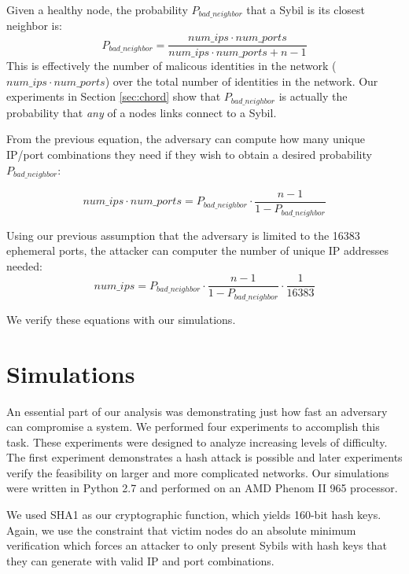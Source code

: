 \documentclass[11pt,conference]{IEEEtran}
\begin{document}
Given a healthy node, the probability $P_{bad\_neighbor}$ that a Sybil is its closest neighbor is:
\begin{equation}
P_{bad\_neighbor} =  \frac{num\_ips \cdot num\_ports}{num\_ips \cdot num\_ports + n - 1}
\label{eq:bad}
\end{equation}
This is effectively the number of malicous identities in the network ($num\_ips \cdot num\_ports$) over the total number of identities in the network.
Our experiments in Section \ref{sec:chord} show that $P_{bad\_neighbor}$ is actually the probability that \textit{any} of a nodes links connect to a Sybil.

From the previous equation, the adversary can compute how many unique IP/port combinations they need if they wish to obtain a desired probability $P_{bad\_neighbor}$:

$$ num\_ips \cdot num\_ports = P_{bad\_neighbor} \cdot \frac{n - 1}{1 - P_{bad\_neighbor} }$$

Using our previous assumption that the adversary is limited to the 16383 ephemeral ports, the attacker can computer the number of unique IP addresses needed:
$$ num\_ips  =  P_{bad\_neighbor} \cdot \frac{n - 1}{1 - P_{bad\_neighbor} }  \cdot \frac{1}{16383}$$


We verify these equations with our simulations.

\section{Simulations}
\label{sec:experiments}
An essential part of our analysis was demonstrating just how fast an adversary can compromise a system.
We performed four experiments to accomplish this task.
These experiments were designed to analyze increasing levels of difficulty.
The first experiment demonstrates a hash attack is possible and later experiments verify the feasibility on larger and more complicated networks.
Our simulations were written in Python 2.7 and performed on an AMD Phenom II 965 processor. %

We used SHA1 as our cryptographic function, which yields 160-bit hash keys.
Again, we use the constraint that victim nodes do an absolute minimum verification which forces an attacker to only present Sybils with hash keys that they can generate with valid IP and port combinations.


\end{document}
